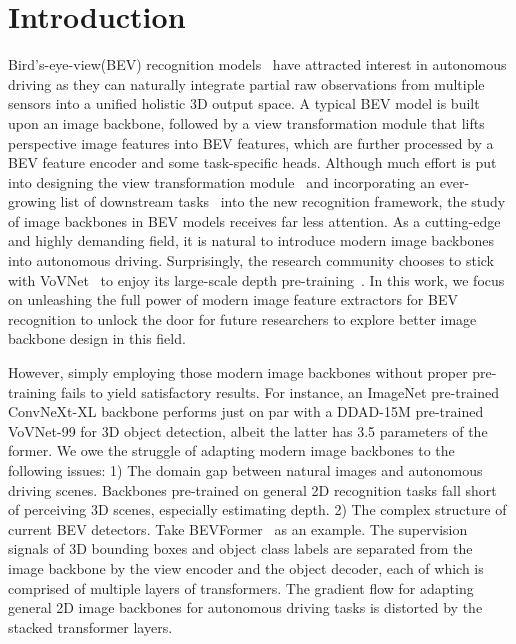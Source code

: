 \documentclass[10pt,twocolumn,letterpaper]{article}
\begin{document}
\vspace{-5pt}
\section{Introduction}
Bird's-eye-view(BEV) recognition models~\cite{OFT,pseudo-lidar,VPN,LSS,bevformer,CVT,PETR} have attracted interest in autonomous driving as they can naturally integrate partial raw observations from multiple sensors into a unified holistic 3D output space.
A typical BEV model is built upon an image backbone, followed by a view transformation module that lifts perspective image features into BEV features, which are further processed by a BEV feature encoder and some task-specific heads.
Although much effort is put into designing the view transformation module~\cite{CVT,LSS,bevformer} and incorporating an ever-growing list of downstream tasks~\cite{LSS,fiery} into the new recognition framework, the study of image backbones in BEV models receives far less attention.
As a cutting-edge and highly demanding field, it is natural to introduce modern image backbones into autonomous driving.
Surprisingly, the research community chooses to stick with VoVNet~\cite{Vovnet} to enjoy its large-scale depth pre-training~\cite{DD3D}.
In this work, we focus on unleashing the full power of modern image feature extractors for BEV recognition to unlock the door for future researchers to explore better image backbone design in this field. 

However, simply employing those modern image backbones without proper pre-training fails to yield satisfactory results. 
For instance, an ImageNet \cite{ImageNet} pre-trained ConvNeXt-XL \cite{ConvNext} backbone performs just on par with a DDAD-15M pre-trained VoVNet-99 \cite{DD3D} for 3D object detection, albeit the latter has 3.5 parameters of the former. 
We owe the struggle of adapting modern image backbones to the following issues: 
1) The domain gap between natural images and autonomous driving scenes.
Backbones pre-trained on general 2D recognition tasks fall short of perceiving 3D scenes, especially estimating depth. 
2) The complex structure of current BEV detectors. 
Take BEVFormer~\cite{bevformer} as an example. The supervision signals of 3D bounding boxes and object class labels are separated from the image backbone by the view encoder and the object decoder, each of which is comprised of multiple layers of transformers. 
The gradient flow for adapting general 2D image backbones for autonomous driving tasks is distorted by the stacked transformer layers.
\end{document}
